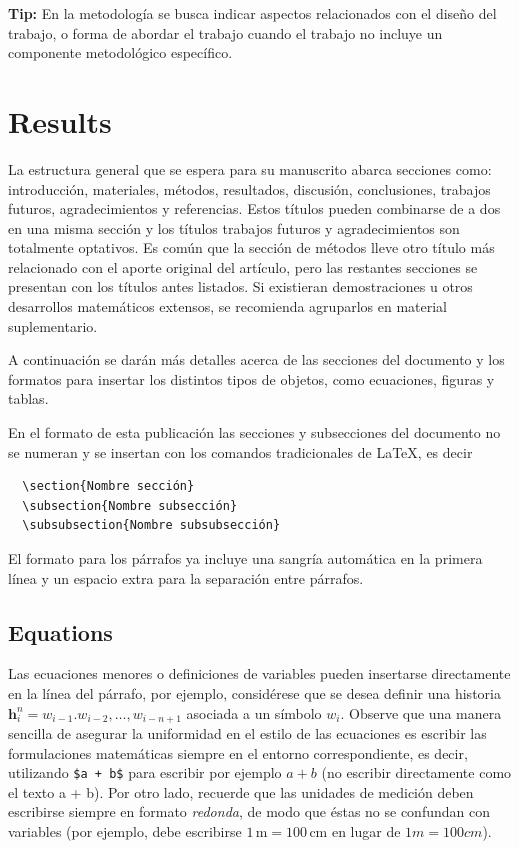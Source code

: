 \documentclass{sophicart}
\newcommand{\vect}[1]{\mathbf{#1}}  %
\begin{document}
\textbf{Tip:} En la metodología se busca indicar aspectos relacionados con el diseño del trabajo, o forma de abordar el trabajo cuando el trabajo no incluye un componente metodológico específico. 


\section{Results}

La estructura general que se espera para su manuscrito abarca secciones como: introducción,
materiales, métodos, resultados, discusión, conclusiones, trabajos futuros, agradecimientos y 
referencias. Estos títulos pueden combinarse de a dos en una misma sección y los títulos trabajos 
futuros y agradecimientos son totalmente optativos. Es común que la sección de métodos lleve otro 
título más relacionado con el aporte original del artículo, pero las restantes secciones se presentan
con los títulos antes listados. Si existieran demostraciones u otros desarrollos matemáticos extensos,
se recomienda agruparlos en material suplementario.

A continuación se darán más detalles acerca de las secciones del documento y los formatos para 
insertar los distintos tipos de objetos, como ecuaciones, figuras y tablas.

En el formato de esta publicación las secciones y subsecciones del documento no se numeran y 
se insertan con los comandos tradicionales de \LaTeX, es decir
\begin{verbatim}
  \section{Nombre sección}
  \subsection{Nombre subsección}
  \subsubsection{Nombre subsubsección}
\end{verbatim}
El formato para los párrafos ya incluye una sangría automática en la primera línea y un espacio extra para la separación entre párrafos.

\subsection{Equations}
Las ecuaciones menores o definiciones de variables pueden insertarse directamente en la línea del
párrafo, por ejemplo, considérese que se desea definir una historia $\vect{h}_i^n = w_{i-1}. w_{i-2},
\dots, w_{i-n+1}$ asociada a un símbolo $w_i$. Observe que una manera sencilla de asegurar la 
uniformidad en el estilo de las ecuaciones es escribir las formulaciones matemáticas siempre en el
entorno correspondiente, es decir, utilizando \verb!$a + b$! para escribir por ejemplo $a + b$
(no escribir directamente como el texto a + b). Por otro lado, recuerde que las unidades de medición
deben escribirse siempre en formato \emph{redonda}, de modo que éstas no se confundan con variables
(por ejemplo, debe escribirse $1\,\text{m} = 100\,\text{cm}$ en lugar de $1m = 100cm$).
\end{document}

